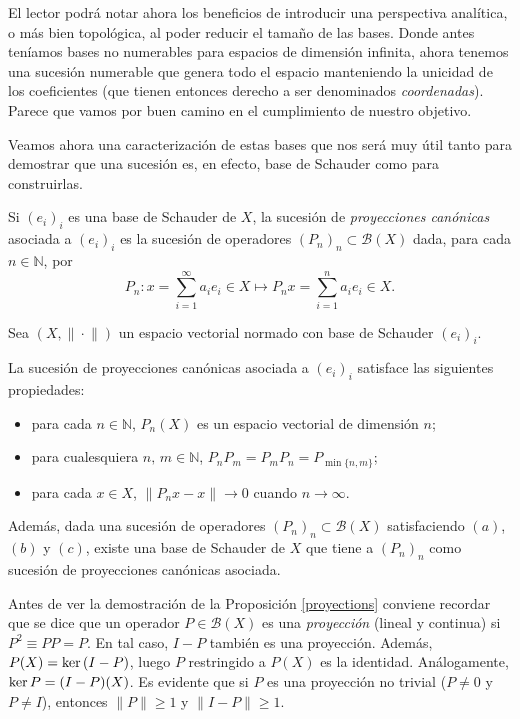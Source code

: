 	El lector podrá notar ahora los beneficios de introducir una perspectiva analítica, o más bien topológica, al poder reducir el tamaño de las bases. Donde antes teníamos bases no numerables para espacios de dimensión infinita, ahora tenemos una sucesión numerable que genera todo el espacio manteniendo la unicidad de los coeficientes (que tienen entonces derecho a ser denominados \emph{coordenadas}). Parece que vamos por buen camino en el cumplimiento de nuestro objetivo.
	
	Veamos ahora una caracterización de estas bases que nos será muy útil tanto para demostrar que una sucesión es, en efecto, base de Schauder como para construirlas.
	
	\begin{definition}
		Si $(e_i)_i$ es una base de Schauder de $X$, la sucesión de \emph{proyecciones canónicas} asociada a $(e_i)_i$ es la sucesión de operadores $(P_n)_n\subset\mathcal{B}(X)$ dada, para cada $n\in\mathbb{N}$, por
		\begin{equation}\label{eq:1}
			P_n\colon x=\sum_{i=1}^\infty a_ie_i\in X\longmapsto P_nx=\sum_{i=1}^n a_ie_i\in X.
		\end{equation}
	\end{definition}
	
	
	Sea $(X,\|\!\cdot\!\|)$ un espacio vectorial normado con base de Schauder $(e_i)_i$.
	
		
	\begin{proposition}\label{proyections}
		La sucesión de proyecciones canónicas asociada a $(e_i)_i$ satisface las siguientes propiedades:
		\begin{itemize}
			\item[$(a)$]{para cada $n\in\mathbb{N}$, $P_n(X)$ es un espacio vectorial de dimensión $n$;}
			\item[$(b)$]{para cualesquiera $n,\,m\in\mathbb{N}$, $P_nP_m=P_mP_n=P_{\min\{n,m\}}$;}
			\item[$(c)$]{para cada $x\in X$, $\|P_nx-x\|\to 0$ cuando $n\to\infty$.}
		\end{itemize}
		Además, dada una sucesión de operadores $(P_n)_n\subset\mathcal{B}(X)$ satisfaciendo $(a)$, $(b)$ y $(c)$, existe una base de Schauder de $X$ que tiene a $(P_n)_n$ como sucesión de proyecciones canónicas asociada.
	\end{proposition}
	
		\begin{nota}
			Antes de ver la demostración de la Proposición \ref{proyections} conviene recordar que se dice que un operador $P\in\mathcal{B}(X)$ es una \emph{proyección} (lineal y continua) si $P^2\equiv PP=P$. En tal caso, $I-P$ también es una proyección. Además, $P(X)={\rm ker}\,(I-P)$, luego $P$ restringido a $P(X)$ es la identidad. Análogamente, ${\rm ker}\,P=(I-P)(X)$. Es evidente que si $P$ es una proyección no trivial ($P\neq 0$ y $P\neq I$), entonces $\|P\|\geq 1$ y $\|I-P\|\geq 1$.
	\end{nota}		
		

